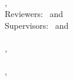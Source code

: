 \begin{titlepage}
	\reqDate\\

\end{titlepage}


\hfill
\vfill
{\small
	\textbf{\firstAuthorName}\\
	\textit{\specTitle}\\
	\reqSubject, \reqDate\\
	Reviewers: \firstReviewer\ and \secondReviewer\\
	Supervisors: \firstSupervisor\ and \secondSupervisor\\[1.5em]
	\textbf{\clientCompany} \\
	\textit{\clientCompanyGroup, \clientCompanyDepartment}\\
	\clientCompanyStreetAddress\\
	\clientCompanyCity, \clientCompanyState{} \clientCompanyPostalCode{}
}

